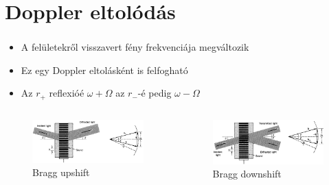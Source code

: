\documentclass[aspectratio=169]{beamer}
\begin{document}
\section{Doppler eltolódás}
\begin{frame}
\frametitle{\secname}
\begin{itemize}
\item A felületekről visszavert fény frekvenciája megváltozik
\item Ez egy Doppler eltolásként is felfogható
\item Az $r_+$ reflexióé $\omega+\Omega$ az $r_-$-é pedig $\omega-\Omega$
\end{itemize}
\begin{columns}
\begin{figure}
\includegraphics[width=.95\textwidth]{refp.png}
\caption{Bragg upshift}
\end{figure}
\begin{figure}
\includegraphics[width=.95\textwidth]{refm.png}
\caption{Bragg downshift}
\end{figure}
\end{columns}
\end{frame}
\end{document}
